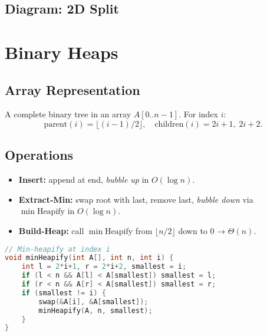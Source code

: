 \documentclass[12pt]{article}
\begin{document}
\subsection*{Diagram: 2D Split}
\begin{center}
\end{center}

\newpage
\section{Binary Heaps}
\subsection*{Array Representation}
A complete binary tree in an array \(A[0..n-1]\).  For index \(i\):
\[
  \text{parent}(i)=\lfloor(i-1)/2\rfloor,\quad
  \text{children}(i)=2i+1,\;2i+2.
\]
\subsection*{Operations}
\begin{itemize}
  \item \textbf{Insert:} append at end, \emph{bubble up} in \(O(\log n)\).
  \item \textbf{Extract‑Min:} swap root with last, remove last, \emph{bubble down} via \(\min\!\mathrm{Heapify}\) in \(O(\log n)\).
  \item \textbf{Build‑Heap:} call \(\min\!\mathrm{Heapify}\) from \(\lfloor n/2\rfloor\) down to 0 → \(\Theta(n)\).
\end{itemize}

\begin{lstlisting}[language=C]
// Min-heapify at index i
void minHeapify(int A[], int n, int i) {
    int l = 2*i+1, r = 2*i+2, smallest = i;
    if (l < n && A[l] < A[smallest]) smallest = l;
    if (r < n && A[r] < A[smallest]) smallest = r;
    if (smallest != i) {
        swap(&A[i], &A[smallest]);
        minHeapify(A, n, smallest);
    }
}
\end{lstlisting}
\end{document}
